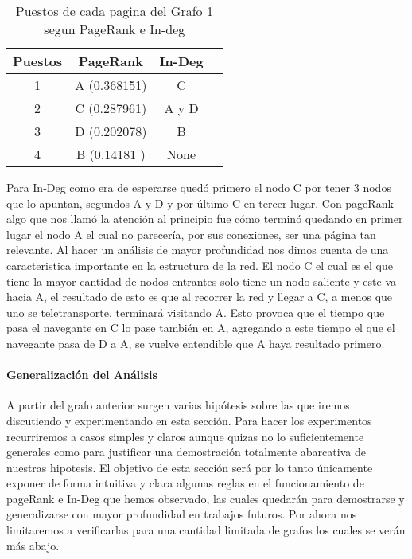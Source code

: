 \begin{table}[H]
\centering
\begin{tabular}{| c | c | c | c |}
  \hline
  \rowcolor{LightCyan}
  Puestos & PageRank & In-Deg \\ \hline \hline
  1 & A (0.368151) & C \\ \hline
  2 & C (0.287961) & A y D \\ \hline
  3 & D (0.202078) & B\\ \hline
  4 & B (0.14181 ) & None \\ \hline
\end{tabular}

  \caption{\footnotesize{Puestos de cada pagina del Grafo 1 segun PageRank e In-deg}}
  \label{tab:Rankings}
\end{table}

Para In-Deg como era de esperarse quedó primero el nodo C por tener 3 nodos que lo apuntan, segundos A y D y por último C en tercer lugar. Con pageRank algo que nos llamó la atención al principio fue cómo terminó quedando en primer lugar el nodo A el cual no parecería, por sus conexiones, ser una página tan relevante. Al hacer un análisis de mayor profundidad nos dimos cuenta de una caracteristica importante en la estructura de la red. El nodo C el cual es el que tiene la mayor cantidad de nodos entrantes solo tiene un nodo saliente y este va hacia A, el resultado de esto es que al recorrer la red y llegar a C, a menos que uno se teletransporte, terminará visitando A. Esto provoca que el tiempo que pasa el navegante en C lo pase también en A, agregando a este tiempo el que el navegante pasa de D a A, se vuelve entendible que A haya resultado primero.

\paragraph{Generalización del Análisis}

A partir del grafo anterior surgen varias hipótesis sobre las que iremos discutiendo y experimentando en esta sección. Para hacer los experimentos recurriremos a casos simples y claros aunque quizas no lo suficientemente generales como para justificar una demostración totalmente abarcativa de nuestras hipotesis. El objetivo de esta sección será por lo tanto únicamente exponer de forma intuitiva y clara algunas reglas en el funcionamiento de pageRank e In-Deg que hemos observado, las cuales quedarán para demostrarse y generalizarse con mayor profundidad en trabajos futuros. Por ahora nos limitaremos a verificarlas para una cantidad limitada de grafos los cuales se verán más abajo.

